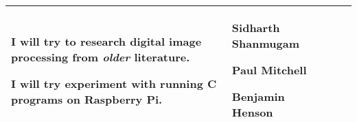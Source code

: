 \begin{table}[!h]
\begin{tabularx}{\textwidth}{|l|X|X|X|}
\begin{myitemize}
            \item I will try to research digital image processing from \textit{older} literature.
            \item I will try experiment with running C programs on Raspberry Pi.
        \end{myitemize} & 
        \begin{myitemize}
            \item Sidharth Shanmugam
            \item Paul Mitchell
            \item Benjamin Henson
        \end{myitemize} \\
        \hline
    \end{tabularx}
\end{table}
